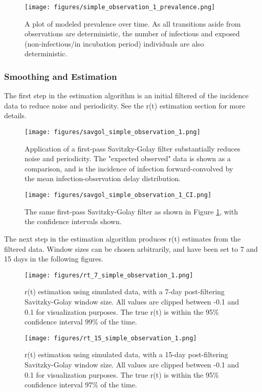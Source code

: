 \documentclass{article}
\begin{document}
\begin{figure}[h!]
\centering
\texttt{[image: figures/simple\_observation\_1\_prevalence.png]}
\caption{A plot of modeled prevalence over time. As all transitions aside from observations are deterministic, the number of infectious and exposed (non-infectious/in incubation period) individuals are also deterministic.}
\end{figure}

\subsubsection{Smoothing and Estimation}

The first step in the estimation algorithm is an initial filtered of the incidence data to reduce noise and periodicity. See the r(t) estimation section for more details.

\begin{figure}[h!]
\centering
\texttt{[image: figures/savgol\_simple\_observation\_1.png]}
\caption{Application of a first-pass Savitzky-Golay filter substantially reduces noise and periodicity. The "expected observed" data is shown as a comparison, and is the incidence of infection forward-convolved by the mean infection-observation delay distribution.}
\label{SGnoCI}
\end{figure}

\begin{figure}[h!]
\centering
\texttt{[image: figures/savgol\_simple\_observation\_1\_CI.png]}
\caption{The same first-pass Savitzky-Golay filter as shown in Figure \ref{SGnoCI}, with the confidence intervals shown.} 

\end{figure}

The next step in the estimation algorithm produces r(t) estimates from the filtered data. Window sizes can be chosen arbitrarily, and have been set to 7 and 15 days in the following figures.


\begin{figure}[h!]
\centering
\texttt{[image: figures/rt\_7\_simple\_observation\_1.png]}
\caption{r(t) estimation using simulated data, with a 7-day post-filtering Savitzky-Golay window size. All values are clipped between -0.1 and 0.1 for visualization purposes. The true r(t) is within the 95\% confidence interval 99\% of the time.}
\end{figure}

\clearpage
\begin{figure}[h!]
\centering
\texttt{[image: figures/rt\_15\_simple\_observation\_1.png]}
\caption{r(t) estimation using simulated data, with a 15-day post-filtering Savitzky-Golay window size. All values are clipped between -0.1 and 0.1 for visualization purposes. The true r(t) is within the 95\% confidence interval 97\% of the time.}
\end{figure}
\end{document}
